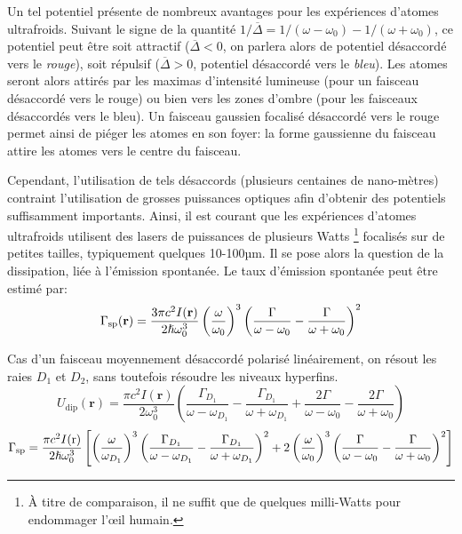 Un tel potentiel présente de nombreux avantages pour les expériences d'atomes ultrafroids. Suivant le signe de la quantité $1/\overline{\Delta} = 1/(\omega-\omega_0)-1/(\omega+\omega_0)$, ce potentiel peut être soit attractif ($\overline{\Delta}<0$, on parlera alors de potentiel désaccordé vers le \emph{rouge}), soit répulsif ($\overline{\Delta}>0$, potentiel désaccordé vers le \emph{bleu}). Les atomes seront alors attirés par les maximas d'intensité lumineuse (pour un faisceau désaccordé vers le rouge) ou bien vers les zones d'ombre (pour les faisceaux désaccordés vers le bleu). Un faisceau gaussien focalisé désaccordé vers le rouge permet ainsi de piéger les atomes en son foyer: la forme gaussienne du faisceau attire les atomes vers le centre du faisceau.

Cependant, l'utilisation de tels désaccords (plusieurs centaines de nano-mètres) contraint l'utilisation de grosses puissances optiques afin d'obtenir des potentiels suffisamment importants. Ainsi, il est courant que les expériences d'atomes ultrafroids utilisent des lasers de puissances de plusieurs Watts \footnote{À titre de comparaison, il ne suffit que de quelques milli-Watts pour endommager l'œil humain.} focalisés sur de petites tailles, typiquement quelques 10-100µm. Il se pose alors la question de la dissipation, liée à l'émission spontanée. Le taux d'émission spontanée peut être estimé par:
\begin{equation}
\Gamma_{\mathrm{sp}}(\mathbf{r})=\frac{3 \pi c^2 I(\mathbf{r})}{2\hslash \omega_0^3} \left( \frac{\omega}{\omega_0}\right)^3 \left( \frac{\Gamma}{\omega-\omega_0}-\frac{\Gamma}{\omega+\omega_0} \right)^2
\end{equation}

Cas d'un faisceau moyennement désaccordé polarisé linéairement, on résout les raies $D_1$ et $D_2$, sans toutefois résoudre les niveaux hyperfins.
\begin{equation}
U_{\mathrm{dip}}(\mathbf{r})=\frac{\pi c^2 I(\mathbf{r})}{2\omega_0^3} \left( \frac{\Gamma_{D_1}}{\omega-\omega_{D_1}} - \frac{\Gamma_{D_1}}{\omega+\omega_{D_1}} + \frac{2\Gamma}{\omega-\omega_0}-\frac{2\Gamma}{\omega+\omega_0}\right)
\end{equation}
\begin{equation}
\Gamma_{\mathrm{sp}}=\frac{\pi c^2 I(\mathrm{r})}{2 \hslash \omega_0^3} \left[ \left(\frac{\omega}{\omega_{D_1}} \right)^3 \left( \frac{\Gamma_{D_1}}{\omega-\omega_{D_1}} - \frac{\Gamma_{D_1}}{\omega+\omega_{D_1}} \right)^2 + 2\left( \frac{\omega}{\omega_0} \right)^3 \left( \frac{\Gamma}{\omega-\omega_0}-\frac{\Gamma}{\omega+\omega_0} \right)^2 \right]
\end{equation}

